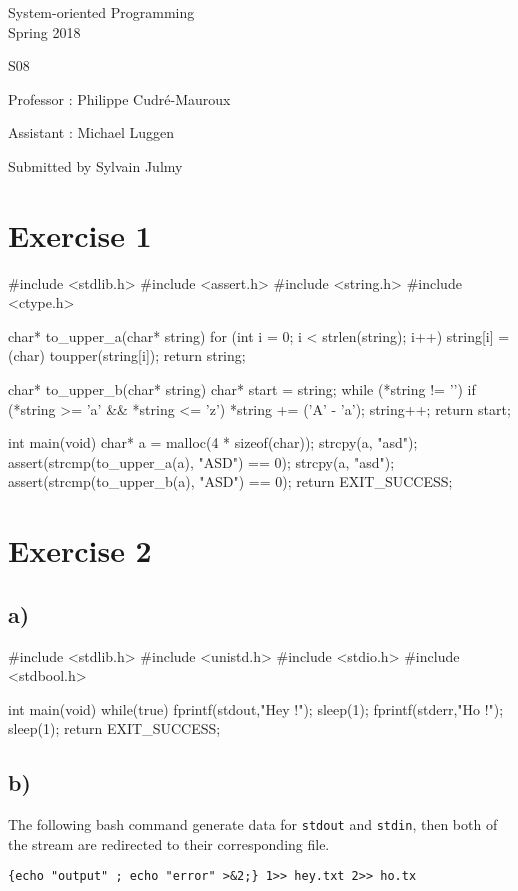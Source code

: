 \documentclass[a4paper,11pt]{report}
\author{Sylvain Julmy}
\date{\today}
\begin{document}
\begin{center}
  \Large{
    System-oriented Programming\\
    Spring 2018
  }
  
  \noindent\makebox[\linewidth]{\rule{\linewidth}{0.4pt}}
  S08
  \noindent\makebox[\linewidth]{\rule{\linewidth}{0.4pt}}

  \begin{flushleft}
    Professor : Philippe Cudré-Mauroux

    Assistant : Michael Luggen
  \end{flushleft}
  
  \noindent\makebox[\linewidth]{\rule{\linewidth}{0.4pt}}

  Submitted by Sylvain Julmy
  
  \noindent\makebox[\linewidth]{\rule{\textwidth}{1pt}}
\end{center}

\section*{Exercise 1}

\begin{ccode}
#include <stdlib.h>
#include <assert.h>
#include <string.h>
#include <ctype.h>

char* to_upper_a(char* string)
{
    for (int i = 0; i < strlen(string); i++)
    {
        string[i] = (char) toupper(string[i]);
    }
    return string;
}

char* to_upper_b(char* string)
{
    char* start = string;
    while (*string != '\0')
    {
        if (*string >= 'a' && *string <= 'z')
            *string += ('A' - 'a');
        string++;
    }
    return start;
}

int main(void)
{
    char* a = malloc(4 * sizeof(char));
    strcpy(a, "asd");
    assert(strcmp(to_upper_a(a), "ASD") == 0);
    strcpy(a, "asd");
    assert(strcmp(to_upper_b(a), "ASD") == 0);
    return EXIT_SUCCESS;
}
\end{ccode}

\newpage

\section*{Exercise 2}

\subsection*{a)}
\begin{ccode}
#include <stdlib.h>
#include <unistd.h>
#include <stdio.h>
#include <stdbool.h>

int main(void)
{
    while(true)
    {
        fprintf(stdout,"Hey !\n");
        sleep(1);
        fprintf(stderr,"Ho !\n");
        sleep(1);
    }
    return EXIT_SUCCESS;
}
\end{ccode}

\subsection*{b)}

The following bash command generate data for \verb+stdout+ and \verb+stdin+,
then both of the stream are redirected to their corresponding file.

\begin{verbatim}
{echo "output" ; echo "error" >&2;} 1>> hey.txt 2>> ho.tx
\end{verbatim}
\end{document}
